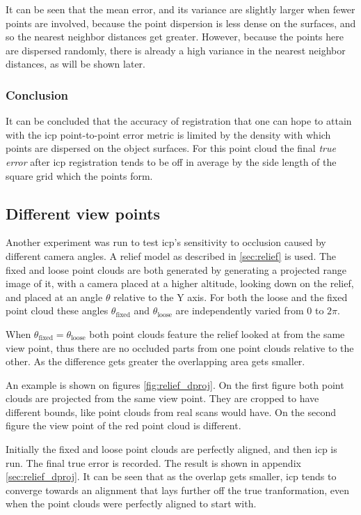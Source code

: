 It can be seen that the mean error, and its variance are slightly larger when fewer points are involved, because the point dispersion is less dense on the surfaces, and so the nearest neighbor distances get greater. However, because the points here are dispersed randomly, there is already a high variance in the nearest neighbor distances, as will be shown later.

\subsubsection{Conclusion}
It can be concluded that the accuracy of registration that one can hope to attain with the \gls{icp} point-to-point error metric is limited by the density with which points are dispersed on the object surfaces. For this point cloud the final \emph{true error} after \gls{icp} registration tends to be off in average by the side length of the square grid which the points form.


\subsection{Different view points}
Another experiment was run to test \gls{icp}'s sensitivity to occlusion caused by different camera angles. A relief model as described in \ref{sec:relief} is used. The fixed and loose point clouds are both generated by generating a projected range image of it, with a camera placed at a higher altitude, looking down on the relief, and placed at an angle $\theta$ relative to the Y axis. For both the loose and the fixed point cloud these angles $\theta_{\text{fixed}}$ and $\theta_{\text{loose}}$ are independently varied from $0$ to $2 \pi$.

When $\theta_{\text{fixed}} = \theta_{\text{loose}}$ both point clouds feature the relief looked at from the same view point, thus there are no occluded parts from one point clouds relative to the other. As the difference gets greater the overlapping area gets smaller.

An example is shown on figures \ref{fig:relief_dproj}. On the first figure both point clouds are projected from the same view point. They are cropped to have different bounds, like point clouds from real scans would have. On the second figure the view point of the red point cloud is different.

Initially the fixed and loose point clouds are perfectly aligned, and then \gls{icp} is run. The final true error is recorded. The result is shown in appendix \ref{sec:relief_dproj}. It can be seen that as the overlap gets smaller, \gls{icp} tends to converge towards an alignment that lays further off the true tranformation, even when the point clouds were perfectly aligned to start with.

